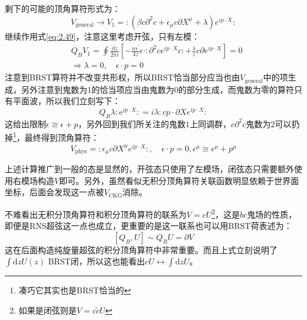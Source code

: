 剩下的可能的顶角算符形式为：
\begin{equation}
	V_{\text{general}}\to V_1=:\left(\beta c\partial^2c+\epsilon_\mu c\partial X^\mu+\lambda\right)e^{ip\cdot X}:
\end{equation}
继续作用式\ref{eq:2.49}，注意这里考虑开弦，只有左模：
\begin{equation}
	\begin{aligned}
		&Q_BV_1=\oint\frac{\mathrm{d}z}{2\pi i}\left[-\frac{i\alpha^{\prime}}{4z}\epsilon\cdotp:\partial^2ce^{ip\cdot X}c:+\frac{\lambda}{z}c\partial e^{ip\cdot X}\right]=0\\
	&\Rightarrow\lambda=0,\quad\epsilon\cdot p=0
	\end{aligned}
\end{equation}
注意到BRST算符并不改变共形权，所以BRST恰当部分应当也由$V_{\text{general}}$中的项生成，另外注意到鬼数为1的恰当项应当由鬼数为0的部分生成，而鬼数为零的算符只有平面波，所以我们立刻写下：
\begin{equation}
	Q_B\lambda :\mathrm{e}^{ip\cdot X}: = i\lambda:cp\cdot\partial Xe^{ip\cdot X}:
\end{equation}
这给出限制$\epsilon\cong\epsilon+p$，另外回到我们所关注的鬼数$1$上同调群，$c\partial^2 c$鬼数为$2$可以扔掉\footnote{凑巧它其实也是BRST恰当的}，最终得到顶角算符：
\begin{equation}
	V_{\text{phys}}=:\epsilon_\mu c\partial X^\mu e^{ip\cdot X}:,\quad \epsilon\cdot p = 0,\epsilon^\mu\cong\epsilon^\mu+p^\mu
\end{equation}

上述计算推广到一般的态是显然的，开弦态只使用了左模场，闭弦态只需要额外使用右模场构造$V$即可。另外，虽然看似无积分顶角算符关联函数明显依赖于世界面坐标，后面会发现这一点被$V_{\mathrm{CKG}}$消除。

不难看出无积分顶角算符和积分顶角算符的联系为$V=cU$\footnote{如果是闭弦则是$V=c\tilde{c}U$}，这是$bc$鬼场的性质，即便是RNS超弦这一点也成立，更重要的是这一联系也可以用BRST荷表述为：
\begin{equation}
	\label{eq:UV}
	[Q_B, U]\sim Q_B U= \partial V
\end{equation}
这在后面构造纯旋量超弦的积分顶角算符中非常重要。而且上式立刻说明了$\int\mathrm{d}z U(z)$ BRST闭，所以这也能看出$cU\leftrightarrow\int\mathrm{d}z U$。
